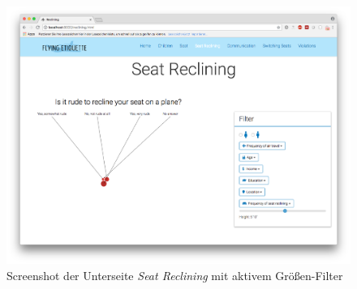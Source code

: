 \documentclass{mi-seminar}
\begin{document}
\begin{figure}[h]
\includegraphics[scale=0.5]{assets/filter_seat_active.png}
\caption{Screenshot der Unterseite \textit{Seat Reclining} mit aktivem Grö{\ss}en-Filter}
\label{ScSeatRecliningActive}
\end{figure}
\end{document}
